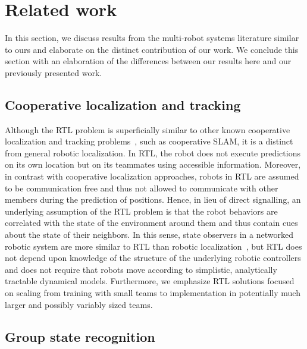 \documentclass[letterpaper, 10 pt, conference]{ieeeconf}  %
\begin{document}
	\section{Related work}
	\label{sec:related_work}

    In this section, we discuss results from the multi-robot
    systems literature similar to ours and elaborate on the distinct
    contribution of our work. We conclude this section with an
    elaboration of the differences between our results here and our
    previously presented work.

    \subsection{Cooperative localization and tracking}

    Although the RTL problem is superficially similar to other known
    cooperative localization and tracking problems~\cite{GKD04, LSRB16,
    FSDO10, CX14, DMG15}, such as cooperative SLAM, it is a distinct
    from general robotic localization. In RTL, the robot does not
    execute predictions on its own location but on its teammates using
    accessible information. Moreover, in contrast with cooperative
    localization approaches, robots in RTL are assumed to be
    communication free and thus not allowed to communicate with other
    members during the prediction of positions. Hence, in lieu of direct
    signalling, an underlying assumption of the RTL problem is that the
    robot behaviors are correlated with the state of the environment
    around them and thus contain cues about the state of their
    neighbors. In this sense, state observers in a networked robotic
    system are more similar to RTL than robotic
    localization~\cite{XNX10, GACM12}, but RTL does not depend upon
    knowledge of the structure of the underlying robotic controllers and
    does not require that robots move according to simplistic,
    analytically tractable dynamical models. Furthermore, we emphasize
    RTL solutions focused on scaling from training with small teams to
    implementation in potentially much larger and possibly variably
    sized teams.

	\subsection{Group state recognition}
	\label{sec:group_state_recognition}
\end{document}
